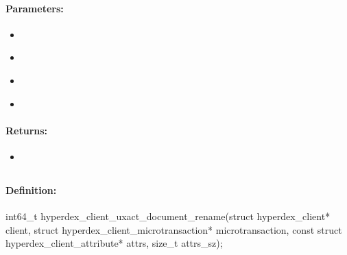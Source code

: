 \paragraph{Parameters:}
\begin{itemize}[noitemsep]
\item {}\\

\item {}\\

\item {}\\

\item {}\\

\end{itemize}

\paragraph{Returns:}
\begin{itemize}[noitemsep]
\item {}\\

\end{itemize}

\pagebreak
\subsection{}
\label{api:c:uxact_document_rename}


\paragraph{Definition:}
\begin{ccode}
int64_t hyperdex_client_uxact_document_rename(struct hyperdex_client* client,
        struct hyperdex_client_microtransaction* microtransaction,
        const struct hyperdex_client_attribute* attrs, size_t attrs_sz);
\end{ccode}

